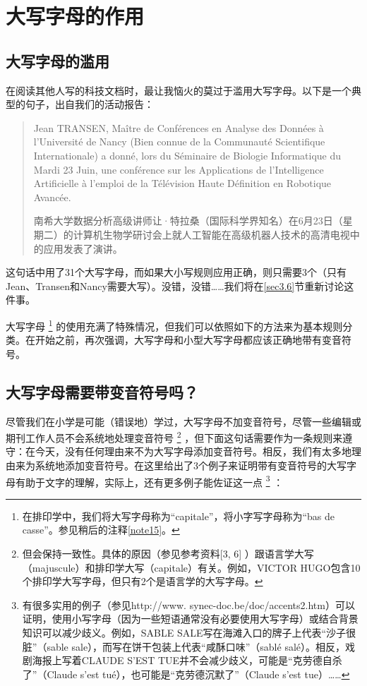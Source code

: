 \chapter{大写字母的作用}

\section{大写字母的滥用}

在阅读其他人写的科技文档时，最让我恼火的莫过于滥用大写字母。以下是一个典型的句子，出自我们的活动报告：

\begin{quote}
    Jean TRANSEN, Maître de Conférences en Analyse des Données à l'Université de Nancy (Bien connue de la Communauté Scientifique Internationale) a donné, lors du Séminaire de Biologie Informatique du Mardi 23 Juin, une conférence sur les Applications de l'Intelligence Artificielle à l'emploi de la Télévision Haute Définition en Robotique Avancée.

    \begin{bil}
        南希大学数据分析高级讲师让·特拉桑（国际科学界知名）在6月23日（星期二）的计算机生物学研讨会上就人工智能在高级机器人技术的高清电视中的应用发表了演讲。
    \end{bil}
\end{quote}
    
这句话中用了31个大写字母，而如果大小写规则应用正确，则只需要3个（只有Jean、Transen和Nancy需要大写）。没错，没错……我们将在\ref{sec3.6}节重新讨论这件事。

大写字母
    \footnote{在排印学中，我们将大写字母称为“capitale”，将小字写字母称为“bas de casse”。参见稍后的注释\ref{note15}。}
的使用充满了特殊情况，但我们可以依照如下的方法来为基本规则分类。在开始之前，再次强调，大写字母和小型大写字母都应该正确地带有变音符号。

\section{大写字母需要带变音符号吗？}

尽管我们在小学是可能（错误地）学过，大写字母不加变音符号，尽管一些编辑或期刊工作人员不会系统地处理变音符号
    \footnote{但会保持一致性。具体的原因（参见参考资料[3, 6]%
    ）跟语言学大写（majuscule）和排印学大写（capitale）有关。例如，VICTOR HUGO包含10个排印学大写字母，但只有2个是语言学的大写字母。}
，但下面这句话需要作为一条规则来遵守：在今天，没有任何理由来不为大写字母添加变音符号。相反，我们有太多地理由来为系统地添加变音符号。在这里给出了3个例子来证明带有变音符号的大写字母有助于文字的理解，实际上，还有更多例子能佐证这一点
    \footnote{有很多实用的例子（参见http://www. synec-doc.be/doc/accents2.htm）可以证明，使用小写字母（因为一些短语通常没有必要使用大写字母）或结合背景知识可以减少歧义。例如，SABLE SALE写在海滩入口的牌子上代表“沙子很脏”（sable sale），而写在饼干包装上代表“咸酥口味”（sablé salé）。相反，戏剧海报上写着CLAUDE S'EST TUE并不会减少歧义，可能是“克劳德自杀了”（Claude s'est tué），也可能是“克劳德沉默了”（Claude s'est tue）……}
：

